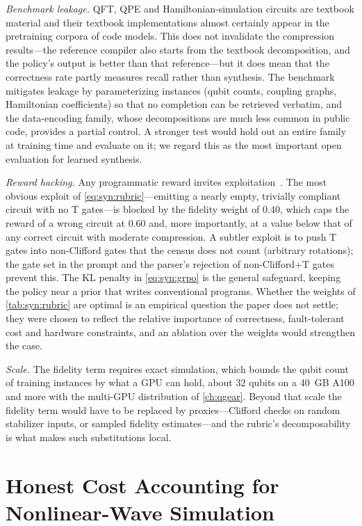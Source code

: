 \emph{Benchmark leakage.} QFT, QPE and Hamiltonian-simulation circuits are textbook material and their textbook implementations almost certainly appear in the pretraining corpora of code models. This does not invalidate the compression results---the reference compiler also starts from the textbook decomposition, and the policy's output is better than that reference---but it does mean that the correctness rate partly measures recall rather than synthesis. The benchmark mitigates leakage by parameterizing instances (qubit counts, coupling graphs, Hamiltonian coefficients) so that no completion can be retrieved verbatim, and the data-encoding family, whose \qcrank{} decompositions are much less common in public code, provides a partial control. A stronger test would hold out an entire family at training time and evaluate on it; we regard this as the most important open evaluation for learned synthesis.

\emph{Reward hacking.} Any programmatic reward invites exploitation~\cite{skalse2022rewardhacking}. The most obvious exploit of \cref{eq:syn:rubric}---emitting a nearly empty, trivially compliant circuit with no T gates---is blocked by the fidelity weight of $0.40$, which caps the reward of a wrong circuit at $0.60$ and, more importantly, at a value below that of any correct circuit with moderate compression. A subtler exploit is to push T gates into non-Clifford gates that the census does not count (arbitrary rotations); the gate set in the prompt and the parser's rejection of non-Clifford+T gates prevent this. The KL penalty in \cref{eq:syn:grpo} is the general safeguard, keeping the policy near a prior that writes conventional programs. Whether the weights of \cref{tab:syn:rubric} are optimal is an empirical question the paper does not settle; they were chosen to reflect the relative importance of correctness, fault-tolerant cost and hardware constraints, and an ablation over the weights would strengthen the case.

\emph{Scale.} The fidelity term requires exact simulation, which bounds the qubit count of training instances by what a GPU can hold, about $32$ qubits on a 40~GB A100 and more with the multi-GPU distribution of \cref{ch:qgear}. Beyond that scale the fidelity term would have to be replaced by proxies---Clifford checks on random stabilizer inputs, or sampled fidelity estimates---and the rubric's decomposability is what makes such substitutions local.

\section{Honest Cost Accounting for Nonlinear-Wave Simulation}\label{sec:syn:waves}

